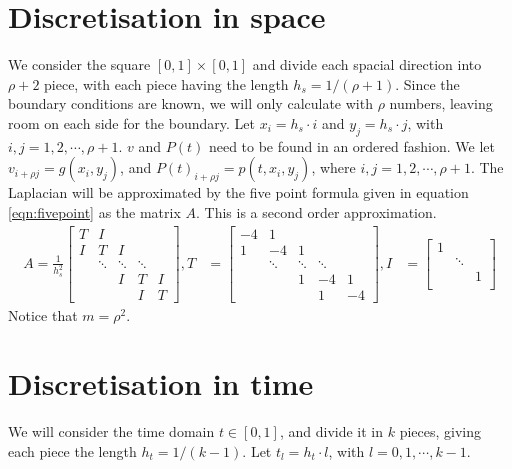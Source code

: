 \section{Discretisation in space} \label{sec:space}
We consider the square $[0,1] \times [0,1]$ and divide each spacial direction into $\rho+2$ piece, with each piece having the length $h_s = 1/(\rho+1)$. Since the boundary conditions are known, we will only calculate with $\rho$ numbers, leaving room on each side for the boundary. Let $x_i = h_s \cdot i$ and $y_j = h_s \cdot j$, with $i,j =1,2,\cdots, \rho + 1 $.  $v$ and $P(t)$ need to be found in an ordered fashion. We let  $v_{i+\rho j} = g(x_i, y_j)$, and 
$P(t)_{i+\rho j} = p(t,x_i, y_j)$, where $i,j = 1,2,\cdots, \rho+1$.
The Laplacian will be approximated by the five point formula given in equation \eqref{eqn:fivepoint} as the matrix $A$. This is a second order approximation.
\begin{equation} \label{eqn:fivepoint} 
\begin{aligned} 
A = \frac{1}{h_s^2} 
\begin{bmatrix}
T & I & & &\\
I& T & I & &\\
& \ddots & \ddots & \ddots & \\
& & I& T & I\\
& & & I & T
\end{bmatrix}
, T  &= 
\begin{bmatrix}
-4 & 1 & & &\\
1 & -4 & 1 & &  \\
& \ddots & \ddots & \ddots & \\
&  & 1 & -4 & 1 \\
 & & & 1 & -4
\end{bmatrix},
I &= 
\begin{bmatrix}
1 & &\\
& \ddots & \\
& & 1 \\
\end{bmatrix}
\end{aligned}
\end{equation}
Notice that $m = \rho ^2$.

\section{Discretisation in time} \label{sec:time}
We will consider the time domain $t \in [0,1] $, and divide it in $k$ pieces, giving each piece the length $h_t = 1/(k-1)$. Let $t_l = h_t\cdot l$, with $l = 0,1,\cdots,k-1 $.\\

